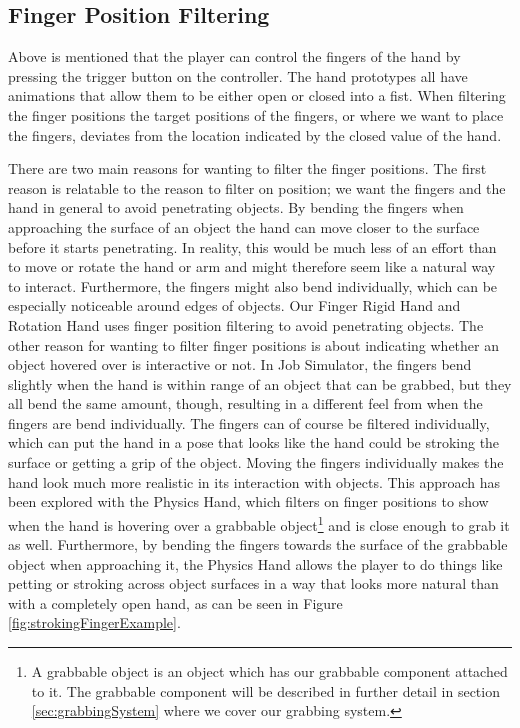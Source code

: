 \subsection{Finger Position Filtering}
\label{subsec:categoryFingerFiltering}
Above is mentioned that the player can control the fingers of the hand by pressing the trigger button on the controller. The hand prototypes all have animations that allow them to be either open or closed into a fist. When filtering the finger positions the target positions of the fingers, or where we want to place the fingers, deviates from the location indicated by the closed value of the hand.

There are two main reasons for wanting to filter the finger positions. The first reason is relatable to the reason to filter on position; we want the fingers and the hand in general to avoid penetrating objects. By bending the fingers when approaching the surface of an object the hand can move closer to the surface before it starts penetrating. In reality, this would be much less of an effort than to move or rotate the hand or arm and might therefore seem like a natural way to interact. Furthermore, the fingers might also bend individually, which can be especially noticeable around edges of objects. Our Finger Rigid Hand and Rotation Hand uses finger position filtering to avoid penetrating objects. The other reason for wanting to filter finger positions is about indicating whether an object hovered over is interactive or not. In Job Simulator, the fingers bend slightly when the hand is within range of an object that can be grabbed, but they all bend the same amount, though, resulting in a different feel from when the fingers are bend individually. The fingers can of course be filtered individually, which can put the hand in a pose that looks like the hand could be stroking the surface or getting a grip of the object. Moving the fingers individually makes the hand look much more realistic in its interaction with objects. This approach has been explored with the Physics Hand, which filters on finger positions to show when the hand is hovering over a grabbable object\footnote{A grabbable object is an object which has our grabbable component attached to it. The grabbable component will be described in further detail in section \ref{sec:grabbingSystem} where we cover our grabbing system.} and is close enough to grab it as well. Furthermore, by bending the fingers towards the surface of the grabbable object when approaching it, the Physics Hand allows the player to do things like petting or stroking across object surfaces in a way that looks more natural than with a completely open hand, as can be seen in Figure \ref{fig:strokingFingerExample}.

